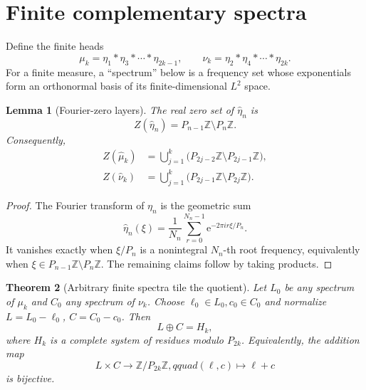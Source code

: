 \documentclass[11pt]{article}
\newtheorem{theorem}{Theorem}
\newtheorem{lemma}[theorem]{Lemma}
\newcommand{\Z}{\mathbb Z}
\newcommand{\e}{\mathrm e}
\begin{document}
\section{Finite complementary spectra}

Define the finite heads
\[
 \mu_k=\eta_1*\eta_3*\cdots*\eta_{2k-1},\qquad
 \nu_k=\eta_2*\eta_4*\cdots*\eta_{2k}.
\]
For a finite measure, a ``spectrum'' below is a frequency set whose
exponentials form an orthonormal basis of its finite-dimensional $L^2$ space.

\begin{lemma}[Fourier-zero layers]\label{lem:layers}
The real zero set of $\widehat\eta_n$ is
\[
 Z(\widehat\eta_n)=P_{n-1}\Z\setminus P_n\Z.
\]
Consequently,
\begin{align*}
 Z(\widehat\mu_k)&=\bigcup_{j=1}^k
   \bigl(P_{2j-2}\Z\setminus P_{2j-1}\Z\bigr),\\
 Z(\widehat\nu_k)&=\bigcup_{j=1}^k
   \bigl(P_{2j-1}\Z\setminus P_{2j}\Z\bigr).
\end{align*}
\end{lemma}

\begin{proof}
The Fourier transform of $\eta_n$ is the geometric sum
\[
 \widehat\eta_n(\xi)=\frac1{N_n}\sum_{r=0}^{N_n-1}
       \e^{-2\pi i r\xi/P_n}.
\]
It vanishes exactly when $\xi/P_n$ is a nonintegral $N_n$-th root frequency,
equivalently when $\xi\in P_{n-1}\Z\setminus P_n\Z$.  The remaining claims
follow by taking products.
\end{proof}

\begin{theorem}[Arbitrary finite spectra tile the quotient]\label{thm:finite}
Let $L_0$ be any spectrum of $\mu_k$ and $C_0$ any spectrum of $\nu_k$.
Choose $\ell_0\in L_0,c_0\in C_0$ and normalize
$L=L_0-\ell_0$, $C=C_0-c_0$.  Then
\[
 L\oplus C=H_k,
\]
where $H_k$ is a complete system of residues modulo $P_{2k}$.  Equivalently,
the addition map
\[
 L\times C\longrightarrow \Z/P_{2k}\Z,qquad
 (\ell,c)\longmapsto \ell+c
\]
is bijective.
\end{theorem}
\end{document}
